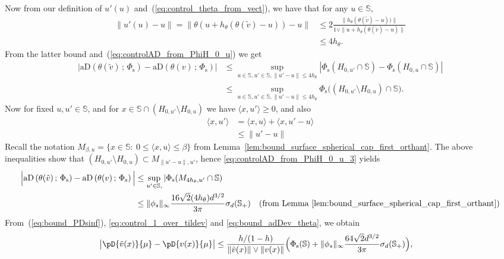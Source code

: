 \documentclass{article}
\numberwithin{equation}{section}
\newcommand{\sphere}{\mathbb{S}}
\newcommand{\mus}{\mu}%
\newcommand{\aD}[2]{{\mathrm{aD}}\left({#1}\,;\,{#2}\right)}
\newcommand{\Phitrad}{\Phi_{\mathrm{s}}} %
\begin{document}
    Now from our definition of $u'(u)$
    and~(\ref{eq:control_theta_from_vect}), we have that for any $u\in\sphere$,
    \begin{align*}
        \|u'(u) - u\| = \| \theta(u  + h_\theta(\theta(\tilde v) -u)) - u\|
    &\le  2 \frac{\|h_\theta(\theta(\tilde v) -u)) \|}{
    1 \vee \| u + h_\theta(\theta(\tilde v) -u) \|} \\
    &\le 4 h_\theta.
\end{align*}
From the latter bound and~(\ref{eq:controlAD_from_PhiH_0_u}) we get
\begin{align}
    \Big|\aD{\theta(\tilde v) }{\Phitrad} - \aD{ \theta(v) }{\Phitrad}\Big|
    &\le \sup_{u \in\sphere, u' \in\sphere, \|u'-u\| \le 4 h_\theta}
    |\Phitrad(H_{0,u'}\cap\sphere) -
    \Phitrad(H_{0,u}\cap\sphere)| \nonumber \\
    & \le \sup_{u \in\sphere, u' \in\sphere, \|u'-u\| \le 4 h_\theta}
      \Phitrad\big(( H_{0,u'}\setminus H_{0,u} )\cap\sphere\big)   . \label{eq:controlAD_from_PhiH_0_u_3}
      \end{align}
Now for fixed $u,u'\in\sphere$, and for $x\in \sphere \cap( H_{0,u'}\setminus H_{0,u} )$ we have $\langle x,u'\rangle \ge 0$, and also 
\begin{align*}
\langle x,u'\rangle  &= \langle x,u\rangle  + \langle x,u'-u\rangle \\
& \le \|u'-u\|
\end{align*}
Recall the notation $M_{\beta,u} = \{x\in \sphere: ~ 0\le \langle x,u\rangle\le \beta \}$ from Lemma~\ref{lem:bound_surface_spherical_cap_first_orthant}. The above inequalities show that $(H_{0,u'}\setminus H_{0,u}) \subset M_{\|u'-u\|, u'}$, hence \eqref{eq:controlAD_from_PhiH_0_u_3} yields 
\begin{align}
    \Big|\aD{\theta(\tilde v) }{\Phitrad} - \aD{ \theta(v) }{\Phitrad}\Big|
    &\le \sup_{u' \in\sphere, }
    |\Phitrad(M_{ 4h_\theta,u'}\cap \sphere) \nonumber \\
    &\le \|\phi_s\|_\infty\frac{16\sqrt{2}(4h_\theta) d^{3/2}}{3\pi}\sigma_{d}(\sphere_+) \quad\textrm{(from Lemma~\ref{lem:bound_surface_spherical_cap_first_orthant})} \label{eq:bound_adDev_theta}
    \end{align}
From~(\ref{eq:bound_PDsinf}), \eqref{eq:control_1_over_tildev} and
\eqref{eq:bound_adDev_theta}, we obtain
\begin{align*}
    \big| \pD{\tilde v(x)}{\mus} - \pD{ v(x)}{\mus} \big|
    &\le \frac{h/(1-h)}{\|\tilde v(x)\| \vee  \| v(x)\| }
    \Big( \Phitrad(\sphere)  + 
    \|\phi_s\|_\infty\frac{64\sqrt{2} d^{3/2}}{3\pi}\sigma_{d}(\sphere_+)
    \Big),
\end{align*}
\end{document}
